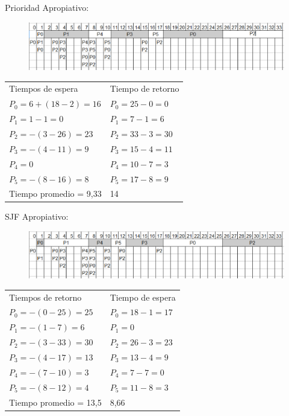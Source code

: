 \documentclass[twoside, a4paper]{article}
\begin{document}
Prioridad Apropiativo:\\
\begin{figure}[!htb]
\includegraphics[scale=0.60]{Prioridad-Apropiativo.eps}
\end{figure}
\begin{tabular}{l l}
Tiempos de espera 		 & Tiempo de retorno\\
$P_0 = 6+(18 - 2)= 16$   & $P_0 = 25-0 = 0$ \\
$P_1 = 1 - 1= 0$ 		 & $P_1 = 7-1= 6$ \\
$P_2 =-(3 - 26)= 23$ 	 & $P_2 = 33-3= 30$\\
$P_3 =-(4 - 11)= 9$ 	 & $P_3 = 15-4= 11$\\
$P_4 = 0$ 				 & $P_4 = 10-7= 3$\\
$P_5 =-(8 - 16)= 8$ 	 & $P_5 = 17-8= 9$\\
Tiempo promedio = 9,33 	 & 14
\end{tabular}
\newline
SJF Apropiativo:\\
\begin{figure}[!htb]
\includegraphics[scale=0.60]{SJF-Apropiativo.eps}
\end{figure}
\begin{tabular}{l l}
Tiempos de retorno 		& Tiempo de espera\\
$P_0 =-(0 - 25)= 25$   	& $P_0 = 18-1= 17$ \\
$P_1 =-(1 - 7)= 6$ 		& $P_1 = 0$ \\
$P_2 =-(3 - 33)= 30$ 	& $P_2 = 26-3= 23$\\
$P_3 =-(4 - 17)= 13$ 	& $P_3 = 13-4= 9$\\
$P_4 =-(7 - 10)= 3$ 	& $P_4 = 7-7= 0$\\
$P_5 =-(8 - 12)= 4$ 	& $P_5 = 11-8= 3$\\
Tiempo promedio = 13,5 	& 8,66
\end{tabular}
\newline
\newline
\end{document}
